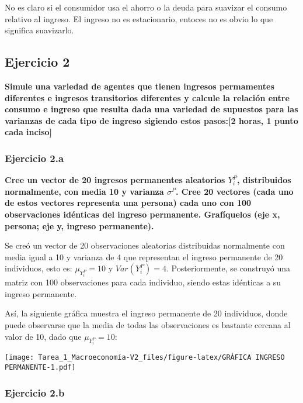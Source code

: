 \documentclass[
]{article}
\begin{document}
No es claro si el consumidor usa el ahorro o la deuda para suavizar el
consumo relativo al ingreso. El ingreso no es estacionario, entoces no
es obvio lo que significa suavizarlo.

\newpage

\hypertarget{ejercicio-2}{%
\subsection{Ejercicio 2}\label{ejercicio-2}}

\textbf{Simule una variedad de agentes que tienen ingresos permamentes
diferentes e ingresos transitorios diferentes y calcule la relación
entre consumo e ingreso que resulta dada una variedad de supuestos para
las varianzas de cada tipo de ingreso sigiendo estos pasos:{[}2 horas, 1
punto cada inciso{]}}

\hypertarget{ejercicio-2.a}{%
\subsubsection{Ejercicio 2.a}\label{ejercicio-2.a}}

\textbf{Cree un vector de 20 ingresos permanentes aleatorios \(Y_i^P\),
distribuidos normalmente, con media 10 y varianza \(\sigma^P\). Cree 20
vectores (cada uno de estos vectores representa una persona) cada uno
con 100 observaciones idénticas del ingreso permanente. Grafíquelos (eje
x, persona; eje y, ingreso permanente).}

Se creó un vector de 20 observaciones aleatorias distribuidas
normalmente con media igual a 10 y varianza de 4 que representan el
ingreso permanente de 20 individuos, esto es: \(\mu_{Y^P_{i}} = 10\) y
\(Var(Y^P_{i}) = 4\). Posteriormente, se construyó una matriz con 100
observaciones para cada individuo, siendo estas idénticas a su ingreso
permanente.

Así, la siguiente gráfica muestra el ingreso permanente de 20
individuos, donde puede observarse que la media de todas las
observaciones es bastante cercana al valor de 10, dado que
\(\mu_{Y^P_{i}} = 10\):

\texttt{[image: Tarea\_1\_Macroeconomía-V2\_files/figure-latex/GRÁFICA INGRESO PERMANENTE-1.pdf]}
\newpage

\hypertarget{ejercicio-2.b}{%
\subsubsection{Ejercicio 2.b}\label{ejercicio-2.b}}
\end{document}
